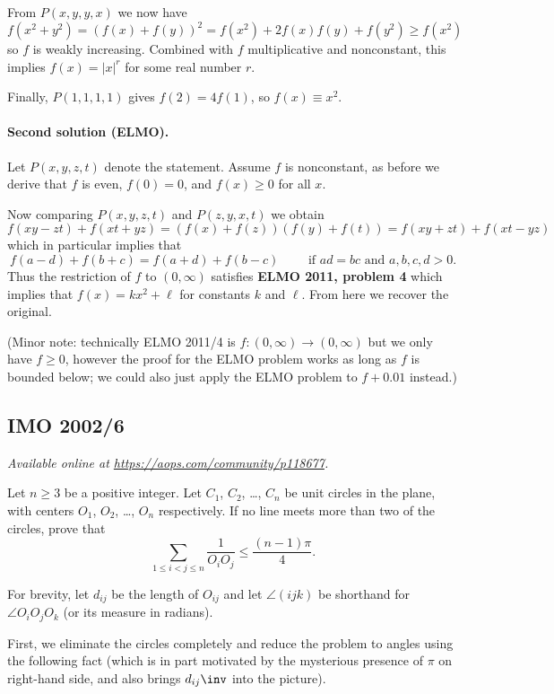 \documentclass[11pt]{scrartcl}
\begin{document}
From $P(x,y,y,x)$ we now have
\[ f(x^2 + y^2) = \left( f(x) + f(y) \right)^2
  = f(x^2) + 2f(x)f(y) + f(y^2) \ge f(x^2) \]
so $f$ is weakly increasing.
Combined with $f$ multiplicative and nonconstant,
this implies $f(x) = |x|^r$ for some real number $r$.

Finally, $P(1,1,1,1)$ gives $f(2) = 4f(1)$,
so $f(x) \equiv x^2$.

\paragraph{Second solution (ELMO).}
Let $P(x,y,z,t)$ denote the statement.
Assume $f$ is nonconstant,
as before we derive that $f$ is even, $f(0) = 0$,
and $f(x) \ge 0$ for all $x$.

Now comparing $P(x,y,z,t)$ and $P(z,y,x,t)$ we obtain
\[ f(xy-zt) + f(xt+yz) =
  \left( f(x)+f(z) \right)
  \left( f(y)+f(t) \right)
  = f(xy+zt) + f(xt-yz) \]
which in particular implies that
\[ f(a-d) + f(b+c) = f(a+d) + f(b-c)
\qquad \text{ if } ad=bc \text{ and } a,b,c,d > 0. \]
Thus the restriction of $f$ to $(0,\infty)$ satisfies
\textbf{ELMO 2011, problem 4}
which implies that $f(x) = kx^2+\ell$ for constants $k$ and $\ell$.
From here we recover the original.

(Minor note: technically ELMO 2011/4 is $f \colon (0,\infty) \to (0,\infty)$
but we only have $f \ge 0$,
however the proof for the ELMO problem
works as long as $f$ is bounded below;
we could also just apply the ELMO problem to $f+0.01$ instead.)
\pagebreak

\subsection{IMO 2002/6}
\textsl{Available online at \url{https://aops.com/community/p118677}.}
\begin{mdframed}[style=mdpurplebox,frametitle={Problem statement}]
Let $n \ge 3$ be a positive integer.
Let $C_1$, $C_2$, \dots, $C_n$ be unit circles in the plane,
with centers $O_1$, $O_2$, \dots, $O_n$ respectively.
If no line meets more than two of the circles, prove that
\[ \sum_{1 \le i < j \le n } \frac{1}{O_i O_j}
  \le \frac{(n-1)\pi}{4}. \]
\end{mdframed}
For brevity, let $d_{ij}$ be the length of $O_{ij}$
and let $\angle(ijk)$ be shorthand for $\angle O_i O_j O_k$
(or its measure in radians).

First, we eliminate the circles completely
and reduce the problem to angles using the following fact
(which is in part motivated by the mysterious
presence of $\pi$ on right-hand side,
and also brings $d_{ij}\inv$ into the picture).
\end{document}
